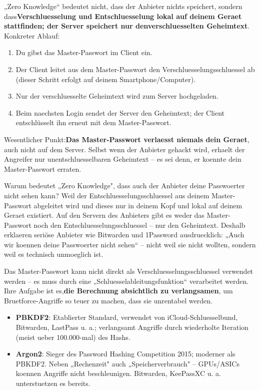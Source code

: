 
„Zero Knowledge“ bedeutet nicht, dass der Anbieter nichts speichert, sondern dass\textbf{Verschluesselung und Entschluesselung lokal auf deinem Geraet stattfinden; der Server speichert nur denverschluesselten Geheimtext}. Konkreter Ablauf:

\begin{enumerate}
  \item Du gibst das Master-Passwort im Client ein.
  \item Der Client leitet aus dem Master-Passwort den Verschluesselungsschluessel ab (dieser Schritt erfolgt auf deinem Smartphone/Computer).
  \item Nur der verschluesselte Geheimtext wird zum Server hochgeladen.
  \item Beim naechsten Login sendet der Server den Geheimtext; der Client entschlüsselt ihn erneut mit dem Master-Passwort.
\end{enumerate}

Wesentlicher Punkt:\textbf{Das Master-Passwort verlaesst niemals dein Geraet}, auch nicht auf dem Server. Selbst wenn der Anbieter gehackt wird, erhaelt der Angreifer nur unentschluesselbaren Geheimtext – es sei denn, er koennte dein Master-Passwort erraten.

\begin{tcbinfo}{Warum bedeutet „Zero Knowledge", dass auch der Anbieter deine Passwoerter nicht sehen kann?}
Weil der Entschluesselungsschluessel aus deinem Master-Passwort abgeleitet wird und dieses nur in deinem Kopf und lokal auf deinem Geraet existiert. Auf den Servern des Anbieters gibt es weder das Master-Passwort noch den Entschluesselungsschluessel – nur den Geheimtext. Deshalb erklaeren seriöse Anbieter wie Bitwarden und 1Password ausdruecklich: „Auch wir koennen deine Passwoerter nicht sehen“ – nicht weil sie nicht wollten, sondern weil es technisch unmoeglich ist.

\end{tcbinfo}


Das Master-Passwort kann nicht direkt als Verschluesselungsschluessel verwendet werden – es muss durch eine „Schluesselableitungsfunktion“ verarbeitet werden. Ihre Aufgabe ist es,\textbf{die Berechnung absichtlich zu verlangsamen}, um Bruetforce-Angriffe so teuer zu machen, dass sie unrentabel werden.

\begin{itemize}
  \item \textbf{PBKDF2}: Etablierter Standard, verwendet von iCloud-Schluesselbund, Bitwarden, LastPass u. a.; verlangsamt Angriffe durch wiederholte Iteration (meist ueber 100.000-mal) des Hashs.
  \item \textbf{Argon2}: Sieger des Password Hashing Competition 2015; moderner als PBKDF2. Neben „Rechenzeit" auch „Speicherverbrauch" – GPUs/ASICs koennen Angriffe nicht beschleunigen. Bitwarden, KeePassXC u. a. unterstuetzen es bereits.
\end{itemize}


